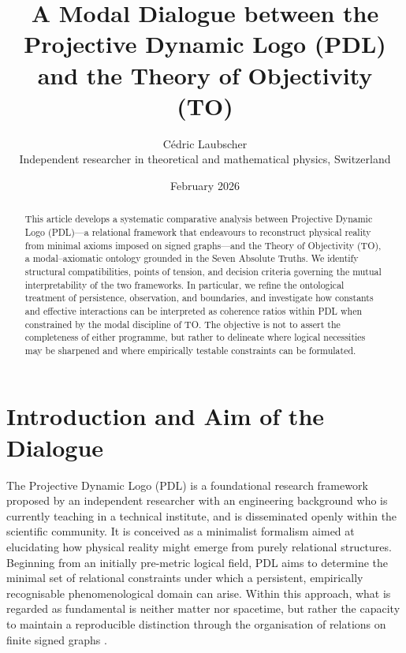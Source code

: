 \documentclass[11pt,a4paper]{article}
\title{A Modal Dialogue between the Projective Dynamic Logo (PDL) and the Theory of Objectivity (TO)}
\author{Cédric Laubscher\\
\small Independent researcher in theoretical and mathematical physics, Switzerland}
\date{February 2026}
\begin{document}
\maketitle

\begin{abstract}
This article develops a systematic comparative analysis between Projective Dynamic Logo (PDL)—a relational framework that endeavours to reconstruct physical reality from minimal axioms imposed on signed graphs—and the Theory of Objectivity (TO), a modal–axiomatic ontology grounded in the Seven Absolute Truths. We identify structural compatibilities, points of tension, and decision criteria governing the mutual interpretability of the two frameworks. In particular, we refine the ontological treatment of persistence, observation, and boundaries, and investigate how constants and effective interactions can be interpreted as coherence ratios within PDL when constrained by the modal discipline of TO. The objective is not to assert the completeness of either programme, but rather to delineate where logical necessities may be sharpened and where empirically testable constraints can be formulated.
\end{abstract}

\section{Introduction and Aim of the Dialogue}

The Projective Dynamic Logo (PDL) is a foundational research framework proposed by an independent researcher with an engineering background who is currently teaching in a technical institute, and is disseminated openly within the scientific community. It is conceived as a minimalist formalism aimed at elucidating how physical reality might emerge from purely relational structures. Beginning from an initially pre-metric logical field, PDL aims to determine the minimal set of relational constraints under which a persistent, empirically recognisable phenomenological domain can arise. Within this approach, what is regarded as fundamental is neither matter nor spacetime, but rather the capacity to maintain a reproducible distinction through the organisation of relations on finite signed graphs \cite{Laubscher_PDL_long,Laubscher_LDP_fr}.
\end{document}
